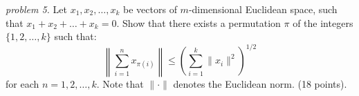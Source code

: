 \textit{problem 5.}
Let \(x_1, x_2,\ldots, x_k\) be vectors of \(m\)-dimensional Euclidean space, such that \(x_1+x_2+\ldots + x_k=0\). Show that there exists a permutation \(\pi\) of the integers \(\{ 1, 2, \ldots, k \}\) such that:
\[\left\lVert \sum_{i=1}^n x_{\pi (i)}\right\rVert \leq \left( \sum_{i=1}^k \lVert x_i \rVert ^2\right)^{1/2}\]for each \(n=1, 2, \ldots, k\). Note that \(\lVert \cdot \rVert\) denotes the Euclidean norm.
(18 points).